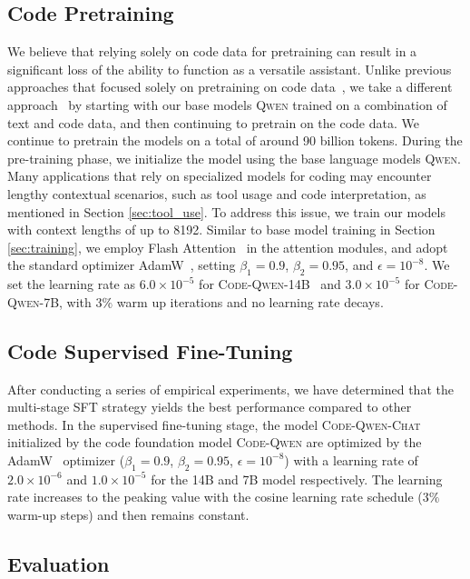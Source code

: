 \subsection{Code Pretraining} We believe that relying solely on code data for pretraining can result in a significant loss of the ability to function as a versatile assistant. Unlike previous approaches that focused solely on pretraining on code data~\citep{AlphaCode, starcoder}, we take a different approach~\citep{code_llama} by starting with our base models \textsc{Qwen} trained on a combination of text and code data, and then continuing to pretrain on the code data. We continue to pretrain the models on a total of around \num{90} billion tokens. During the pre-training phase, we initialize the model using the base language models \textsc{Qwen}.
Many applications that rely on specialized models for coding may encounter lengthy contextual scenarios, such as tool usage and code interpretation, as mentioned in Section \ref{sec:tool_use}. To address this issue, we train our models with context lengths of up to \num{8192}. 
Similar to base model training in Section \ref{sec:training}, we employ Flash Attention~\citep{flashattn} in the attention modules, and adopt the standard optimizer AdamW~\citep{adam,adamw}, setting  $\beta_{1} = 0.9$, $\beta_{2} = 0.95$, and $\epsilon = 10^{-8}$. We set the learning rate as $6.0 \times 10^{-5}$ for \textsc{Code-Qwen-14B}~ and $3.0 \times 10^{-5}$ for \textsc{Code-Qwen-7B}, with $3\%$ warm up iterations and no learning rate decays. 

\subsection{Code Supervised Fine-Tuning} After conducting a series of empirical experiments, we have determined that the multi-stage SFT strategy yields the best performance compared to other methods. In the supervised fine-tuning stage, the model \textsc{Code-Qwen-Chat} initialized by the code foundation model \textsc{Code-Qwen} are optimized by the AdamW~\citep{adam,adamw} optimizer ($\beta_{1} = 0.9$, $\beta_{2} = 0.95$, $\epsilon = 10^{-8}$) with a learning rate of $2.0 \times 10^{-6}$ and $1.0 \times 10^{-5}$ for the \num{14}B and \num{7}B model respectively. The learning rate increases to the peaking value with the cosine learning rate schedule ($3\%$ warm-up steps) and then remains constant.
\subsection{Evaluation}

